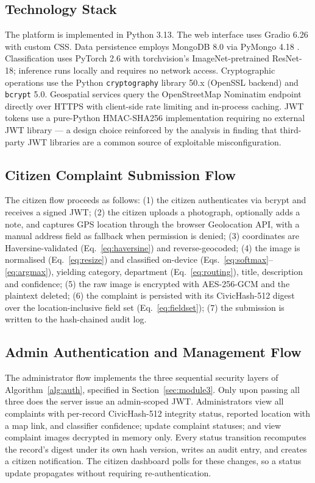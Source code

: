 \documentclass[conference]{IEEEtran}
\begin{document}
\subsection{Technology Stack}
The platform is implemented in Python 3.13. The web interface uses Gradio 6.26 with custom CSS. Data persistence employs MongoDB 8.0 via PyMongo 4.18 \cite{chodorow2013mongodb}. Classification uses PyTorch 2.6 with torchvision's ImageNet-pretrained ResNet-18; inference runs locally and requires no network access. Cryptographic operations use the Python \texttt{cryptography} library 50.x (OpenSSL backend) and \texttt{bcrypt} 5.0. Geospatial services query the OpenStreetMap Nominatim endpoint \cite{haklay2008osm} directly over HTTPS with client-side rate limiting and in-process caching. JWT tokens use a pure-Python HMAC-SHA256 implementation requiring no external JWT library \cite{jones2015jwt} --- a design choice reinforced by the analysis in \cite{l20jwteemo} finding that third-party JWT libraries are a common source of exploitable misconfiguration.

\subsection{Citizen Complaint Submission Flow}
The citizen flow proceeds as follows: (1) the citizen authenticates via bcrypt and receives a signed JWT; (2) the citizen uploads a photograph, optionally adds a note, and captures GPS location through the browser Geolocation API, with a manual address field as fallback when permission is denied; (3) coordinates are Haversine-validated (Eq.~\ref{eq:haversine}) and reverse-geocoded; (4) the image is normalised (Eq.~\ref{eq:resize}) and classified on-device (Eqs.~\ref{eq:softmax}--\ref{eq:argmax}), yielding category, department (Eq.~\ref{eq:routing}), title, description and confidence; (5) the raw image is encrypted with AES-256-GCM and the plaintext deleted; (6) the complaint is persisted with its CivicHash-512 digest over the location-inclusive field set (Eq.~\ref{eq:fieldset}); (7) the submission is written to the hash-chained audit log.

\subsection{Admin Authentication and Management Flow}
The administrator flow implements the three sequential security layers of Algorithm~\ref{alg:auth}, specified in Section~\ref{sec:module3}. Only upon passing all three does the server issue an admin-scoped JWT. Administrators view all complaints with per-record CivicHash-512 integrity status, reported location with a map link, and classifier confidence; update complaint statuses; and view complaint images decrypted in memory only. Every status transition recomputes the record's digest under its own hash version, writes an audit entry, and creates a citizen notification. The citizen dashboard polls for these changes, so a status update propagates without requiring re-authentication.
\end{document}
